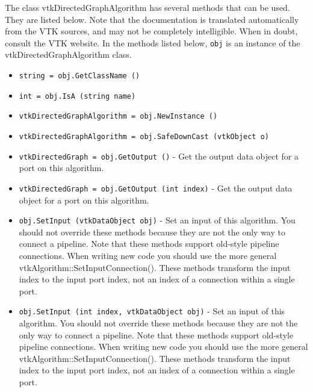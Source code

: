 The class vtkDirectedGraphAlgorithm has several methods that can be used.
  They are listed below.
Note that the documentation is translated automatically from the VTK sources,
and may not be completely intelligible.  When in doubt, consult the VTK website.
In the methods listed below, \verb|obj| is an instance of the vtkDirectedGraphAlgorithm class.
\begin{itemize}
\item  \verb|string = obj.GetClassName ()|

\item  \verb|int = obj.IsA (string name)|

\item  \verb|vtkDirectedGraphAlgorithm = obj.NewInstance ()|

\item  \verb|vtkDirectedGraphAlgorithm = obj.SafeDownCast (vtkObject o)|

\item  \verb|vtkDirectedGraph = obj.GetOutput ()| -  Get the output data object for a port on this algorithm.

\item  \verb|vtkDirectedGraph = obj.GetOutput (int index)| -  Get the output data object for a port on this algorithm.

\item  \verb|obj.SetInput (vtkDataObject obj)| -  Set an input of this algorithm. You should not override these
 methods because they are not the only way to connect a pipeline.
 Note that these methods support old-style pipeline connections.
 When writing new code you should use the more general
 vtkAlgorithm::SetInputConnection().  These methods transform the
 input index to the input port index, not an index of a connection
 within a single port.

\item  \verb|obj.SetInput (int index, vtkDataObject obj)| -  Set an input of this algorithm. You should not override these
 methods because they are not the only way to connect a pipeline.
 Note that these methods support old-style pipeline connections.
 When writing new code you should use the more general
 vtkAlgorithm::SetInputConnection().  These methods transform the
 input index to the input port index, not an index of a connection
 within a single port.

\end{itemize}
